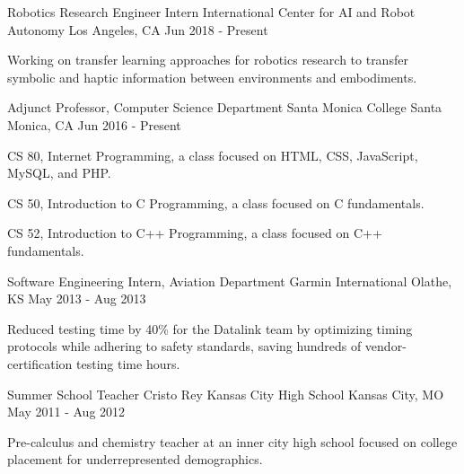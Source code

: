 


\begin{cventries}



\cventry
{Robotics Research Engineer Intern}
{International Center for AI and Robot Autonomy}
{Los Angeles, CA}
{Jun 2018 - Present}
{
\begin{cvitems}
\item Working on transfer learning approaches for robotics research to transfer symbolic and haptic information between environments and embodiments.
\end{cvitems}
}


\cventry
{Adjunct Professor, Computer Science Department}
{Santa Monica College}
{Santa Monica, CA}
{Jun 2016 - Present}
{
\begin{cvitems}
\item CS 80, Internet Programming, a class focused on HTML, CSS, JavaScript, MySQL, and PHP.
\item CS 50, Introduction to C Programming, a class focused on C fundamentals.
\item CS 52, Introduction to C++ Programming, a class focused on C++ fundamentals.
\end{cvitems}
}


\cventry
{Software Engineering Intern, Aviation Department}
{Garmin International}
{Olathe, KS}
{May 2013 - Aug 2013}
{
\begin{cvitems}
\item Reduced testing time by 40\% for the Datalink team by optimizing timing protocols while adhering to safety standards, saving hundreds of vendor-certification testing time hours.
\end{cvitems}
}


\cventry
{Summer School Teacher}
{Cristo Rey Kansas City High School}
{Kansas City, MO}
{May 2011 - Aug 2012}
{
\begin{cvitems}
\item Pre-calculus and chemistry teacher at an inner city high school focused on college placement for underrepresented demographics.
\end{cvitems}
}

\end{cventries}